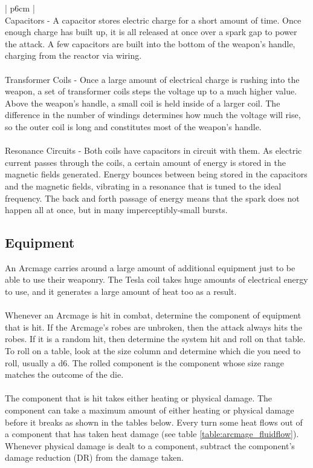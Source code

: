 \documentclass[a4paper]{article}
\begin{document}
\begin{minipage}[t]{0.45\linewidth}
\begin{tabular}[t]{| p{6cm} |}
\toprule
{} \\
\midrule
Capacitors - A capacitor stores electric charge for a short amount of time. Once enough charge has built up, it is all released at once over a spark gap to power the attack. A few capacitors are built into the bottom of the weapon's handle, charging from the reactor via wiring. \\
\\
Transformer Coils - Once a large amount of electrical charge is rushing into the weapon, a set of transformer coils steps the voltage up to a much higher value. Above the weapon's handle, a small coil is held inside of a larger coil. The difference in the number of windings determines how much the voltage will rise, so the outer coil is long and constitutes most of the weapon's handle. \\ 
\\
Resonance Circuits - Both coils have capacitors in circuit with them. As electric current passes through the coils, a certain amount of energy is stored in the magnetic fields generated. Energy bounces between being stored in the capacitors and the magnetic fields, vibrating in a resonance that is tuned to the ideal frequency. The back and forth passage of energy means that the spark does not happen all at once, but in many imperceptibly-small bursts. \\ 
\bottomrule
\end{tabular}
\end{minipage}

\subsection{Equipment}

An Arcmage carries around a large amount of additional equipment just to be able to use their weaponry. The Tesla coil takes huge amounts of electrical energy to use, and it generates a large amount of heat too as a result. 
\\ \\
Whenever an Arcmage is hit in combat, determine the component of equipment that is hit. If the Arcmage's robes are unbroken, then the attack always hits the robes. If it is a random hit, then determine the system hit and roll on that table. To roll on a table, look at the size column and determine which die you need to roll, usually a d6. The rolled component is the component whose size range matches the outcome of the die. 
\\ \\ 
The component that is hit takes either heating or physical damage. The component can take a maximum amount of either heating or physical damage before it breaks as shown in the tables below. Every turn some heat flows out of a component that has taken heat damage (see table \ref{table:arcmage_fluidflow}). Whenever physical damage is dealt to a component, subtract the component's damage reduction (DR) from the damage taken.
\end{document}
